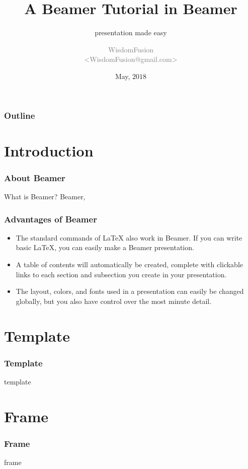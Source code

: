 \documentclass[aspectratio=169,utf8]{ctexbeamer}
\title[Beamer Tutorial]{
  A Beamer Tutorial in Beamer
}
\subtitle{presentation made easy}
\author[WisdomFusion]{
  \scriptsize \textcolor{gray}{WisdomFusion\\ <WisdomFusion@gmail.com>}
}
\date{May, $2018$}
\begin{document}
\addtocounter{framenumber}{-1}


\begin{frame}
  \titlepage
\end{frame}

\begin{frame}
  \frametitle{Outline}
  \tableofcontents
\end{frame}


\section*{Introduction}
\begin{frame}[t]
  \frametitle{About Beamer}

  \begin{block}{What is Beamer?}
    Beamer,
  \end{block}
  
\end{frame}


\begin{frame}
  \frametitle{Advantages of Beamer}

  \begin{itemize}
    \item The standard commands of \LaTeX{} also work in Beamer. If you can write basic \LaTeX{}, you can easily make a Beamer presentation.
    \item A table of contents will automatically be created, complete with clickable links to each section and subsection you create in your presentation.
    \item The layout, colors, and fonts used in a presentation can easily be changed globally, but you also have control over the most minute detail.
  \end{itemize}
  
\end{frame}

\section*{Template}
\begin{frame}
  \frametitle{Template}

  template

\end{frame}

\section*{Frame}
\begin{frame}
  \frametitle{Frame}

  frame
\end{frame}
\end{document}
